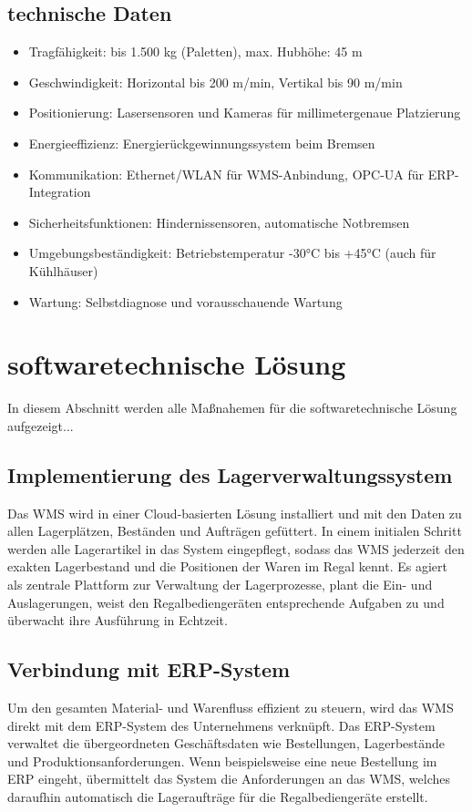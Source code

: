 \subsection{technische Daten}
\begin{itemize}
	\item Tragfähigkeit: bis 1.500 kg (Paletten), max. Hubhöhe: 45 m
	\item Geschwindigkeit: Horizontal bis 200 m/min, Vertikal bis 90 m/min
	\item Positionierung: Lasersensoren und Kameras für millimetergenaue Platzierung
	\item Energieeffizienz: Energierückgewinnungssystem beim Bremsen
	\item Kommunikation: Ethernet/WLAN für WMS-Anbindung, OPC-UA für ERP-Integration
	\item Sicherheitsfunktionen: Hindernissensoren, automatische Notbremsen
	\item Umgebungsbeständigkeit: Betriebstemperatur -30°C bis +45°C (auch für Kühlhäuser)
	\item Wartung: Selbstdiagnose und vorausschauende Wartung
\end{itemize}


\section{softwaretechnische Lösung}
In diesem Abschnitt werden alle Maßnahemen für die softwaretechnische Lösung aufgezeigt...
\subsection{Implementierung des Lagerverwaltungssystem}
Das WMS wird in einer Cloud-basierten Lösung installiert und mit den Daten zu allen Lagerplätzen, Beständen und Aufträgen gefüttert. In einem initialen Schritt werden alle Lagerartikel in das System eingepflegt, sodass das WMS jederzeit den exakten Lagerbestand und die Positionen der Waren im Regal kennt. Es agiert als zentrale Plattform zur Verwaltung der Lagerprozesse, plant die Ein- und Auslagerungen, weist den Regalbediengeräten entsprechende Aufgaben zu und überwacht ihre Ausführung in Echtzeit.

\subsection{Verbindung mit ERP-System}
Um den gesamten Material- und Warenfluss effizient zu steuern, wird das WMS direkt mit dem ERP-System des Unternehmens verknüpft. Das ERP-System verwaltet die übergeordneten Geschäftsdaten wie Bestellungen, Lagerbestände und Produktionsanforderungen. Wenn beispielsweise eine neue Bestellung im ERP eingeht, übermittelt das System die Anforderungen an das WMS, welches daraufhin automatisch die Lageraufträge für die Regalbediengeräte erstellt.

